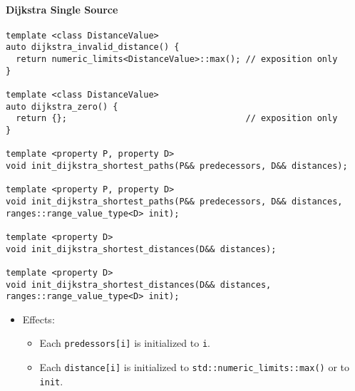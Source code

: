 \paragraph{Dijkstra Single Source}

\begin{lstlisting}
template <class DistanceValue>
auto dijkstra_invalid_distance() {
  return numeric_limits<DistanceValue>::max(); // exposition only
}

template <class DistanceValue>
auto dijkstra_zero() {
  return {};                                   // exposition only
}

template <property P, property D>
void init_dijkstra_shortest_paths(P&& predecessors, D&& distances);

template <property P, property D>
void init_dijkstra_shortest_paths(P&& predecessors, D&& distances, ranges::range_value_type<D> init);

template <property D>
void init_dijkstra_shortest_distances(D&& distances);

template <property D>
void init_dijkstra_shortest_distances(D&& distances, ranges::range_value_type<D> init);

\end{lstlisting}

\begin{itemize}
\item[] 
Effects:
\begin{itemize}
\item[]
  Each \lstinline{predessors[i]} is initialized to \lstinline{i}.
\item[] Each 
\lstinline{distance[i]} is initialized to \lstinline{std::numeric_limits::max()}
or to \lstinline{init}.
\end{itemize}
\end{itemize}


